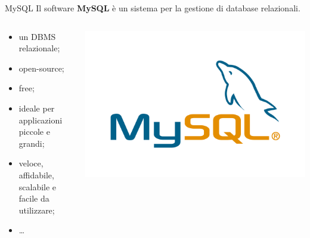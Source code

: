 \begin{frame}{MySQL}
Il software \textbf{MySQL} \`e un sistema per la gestione di database relazionali.
\begin{columns}[T]%
    \begin{column}{0.6\textwidth}%
            \begin{itemize}[<+->]
                \item un DBMS relazionale;
                \item open-source;
                \item free;
                \item ideale per applicazioni piccole e grandi;
                \item veloce, affidabile, scalabile e facile da utilizzare;
                \item \ldots
            \end{itemize}
         \end{column}
    \begin{column}{0.4\textwidth}
        \includegraphics[width=\textwidth]{img/logo-mysql.png}
    \end{column}
\end{columns}
\end{frame}
%
